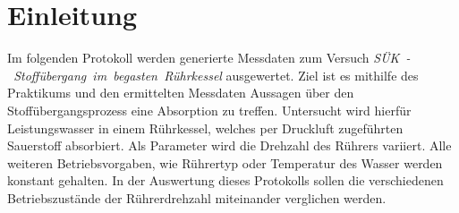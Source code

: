 %
\pagebreak
\section{Einleitung}
\label{sec:einleitung}
Im folgenden Protokoll werden generierte Messdaten zum Versuch \mbox{\textit{SÜK - Stoffübergang im begasten Rührkessel}} ausgewertet. Ziel ist es mithilfe des Praktikums und den ermittelten Messdaten Aussagen über den Stoffübergangsprozess eine Absorption zu treffen. Untersucht wird hierfür Leistungswasser in einem Rührkessel, welches per Druckluft zugeführten Sauerstoff  absorbiert. Als Parameter wird die Drehzahl des Rührers variiert. Alle weiteren Betriebsvorgaben, wie Rührertyp oder Temperatur des Wasser werden konstant gehalten. In der Auswertung dieses Protokolls sollen die verschiedenen Betriebszustände der Rührerdrehzahl miteinander verglichen werden. 





